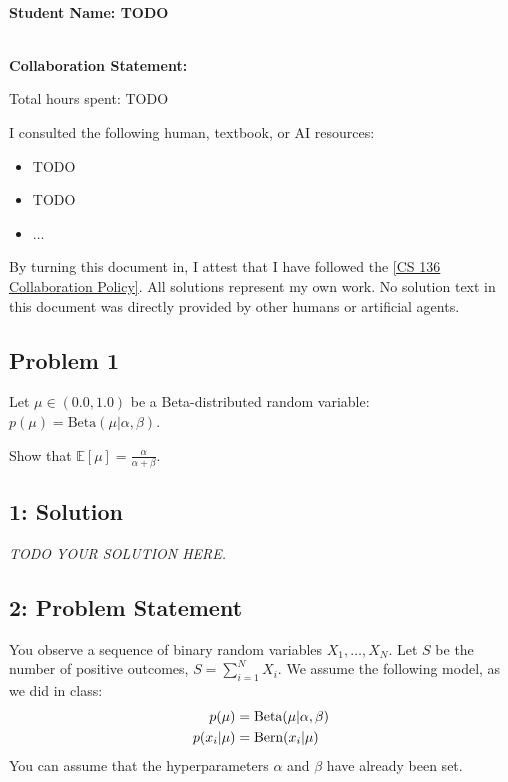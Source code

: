 \documentclass[10pt]{article}
\newcommand{\officialdirections}[1]{{\color{purple} #1}}
\begin{document}
~\\ %

{\Large{\bf Student Name: TODO}}

~\\ %
{\bf Collaboration Statement:}

Total hours spent: TODO

I consulted the following human, textbook, or AI resources:
\begin{itemize}
\item TODO
\item TODO
\item $\ldots$	
\end{itemize}

By turning this document in, I attest that I have followed the 
\href{https://www.cs.tufts.edu/cs/136/2026f/index.html#collaboration}{[CS 136 Collaboration Policy]}. All solutions represent my own work. No solution text in this document was directly provided by other humans or artificial agents. 

\tableofcontents

\newpage
\officialdirections{
\subsection*{Problem 1}
Let $\mu \in (0.0, 1.0)$ be a Beta-distributed random variable: $p(\mu) = \text{Beta}(\mu|\alpha, \beta)$.

Show that $\mathbb{E}[ \mu ] = \frac{\alpha}{\alpha + \beta}$.
}

\subsection{1: Solution}

\emph{TODO YOUR SOLUTION HERE.}


\newpage
\officialdirections{
\subsection*{2: Problem Statement}
You observe a sequence of binary random variables $X_1, \ldots, X_N$. Let $S$ be the number of positive outcomes, $S = \sum_{i=1}^N X_i$. We assume the following model, as we did in class:
\begin{align*}
p(\mu) &= \textnormal{Beta}(\mu|\alpha, \beta)\\
p(x_i|\mu) &= \textnormal{Bern}(x_i|\mu)
\end{align*}
You can assume that the hyperparameters $\alpha$ and $\beta$ have already been set. 
}
\end{document}

